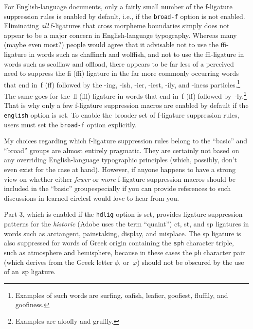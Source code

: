 \documentclass[12pt]{article}
\newcommand{\opt}[1]{\texttt{#1}}
\begin{document}
For English-language documents, only a fairly small number of the f-ligature suppression rules is enabled by default, i.e., if the \opt{broad-f} option is not enabled. Eliminating \emph{all} f-ligatures that cross morpheme boundaries simply does not appear to be a major concern in English-language typography. Whereas many (maybe even most?) people would agree that it advisable not to use the ffi-ligature in words such as chaffinch and wolffish, and not to use the ffl-ligature in words such as scofflaw and offload, there appears to be far less of a perceived need to suppress the fi (ffi) ligature in the far more commonly occurring words that end in~f (ff) followed by the -ing, -ish, -ier, -iest, -ily, and -iness particles.\footnote{Examples of such words are sur\mbox{fi}ng, oa\mbox{fi}sh, lea\mbox{fi}er, goo\mbox{fi}est, flu\mbox{ff}ily, and goo\mbox{fi}ness.} The same goes for the~fl (ffl) ligature in words that end in~f (ff) followed by~-ly.\footnote{Examples are \mbox{aloofly} and \mbox{gruffly}.} That is why only a few f-ligature suppression macros are enabled by default if the \opt{english} option is set. To enable the broader set of f-ligature suppression rules, users must set the \opt{broad-f} option explicitly.

My choices regarding which f-ligature suppression rules belong to the \enquote{basic} and \enquote{broad} groups are almost entirely pragmatic. They are certainly not based on any overriding English-language typographic principles (which, possibly, don't even exist for the case at hand). However, if anyone happens to have a strong view on whether either \emph{fewer} or \emph{more} f-ligature suppression macros should be included in the \enquote{basic} group\textemdash especially if you can provide references to such discussions in learned circles\textemdash I would love to hear from you.


Part 3, which is enabled if the \opt{hdlig} option is set, provides ligature suppression patterns for the \emph{historic} (Adobe uses the term \enquote{quaint}) \mbox{ct}, \mbox{st}, and \mbox{sp} ligatures in words such as arctangent, painstaking, display, and misplace. The sp ligature is also suppressed for words of Greek origin containing the \opt{sph} character triple, such as atmosphere and hemisphere, because in these cases the \opt{ph} character pair (which derives from the Greek letter $\phi$, or~$\varphi$) should not be obscured by the use of an~sp ligature.
\end{document}
